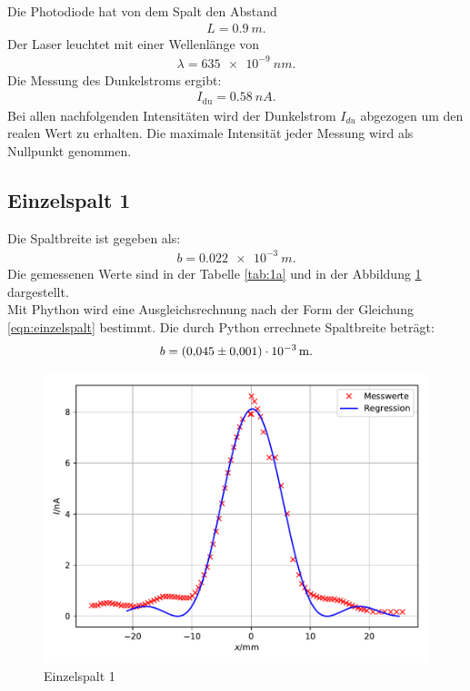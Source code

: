 Die Photodiode hat von dem Spalt den Abstand
\begin{align*}
  L=\SI{0,9}{m}.
\end{align*}
Der Laser leuchtet mit einer Wellenlänge von
\begin{align*}
  \lambda=\SI{635e-9}{nm}.
\end{align*}
Die Messung des Dunkelstroms ergibt:
\begin{align*}
  I_{\text{du}}=\SI{0,58}{nA}.
\end{align*}
Bei allen nachfolgenden Intensitäten wird der Dunkelstrom $I_{du}$ abgezogen um den realen Wert zu erhalten.
Die maximale Intensität jeder Messung wird als Nullpunkt genommen.
\subsection{Einzelspalt 1}
Die Spaltbreite ist gegeben als:
\begin{align*}
  b=\SI{0,022e-3}{m}.
\end{align*}
Die gemessenen Werte sind in der Tabelle \ref{tab:1a} und in der Abbildung \ref{fig:1a} dargestellt.\\
Mit Phython wird eine Ausgleichsrechnung nach der Form der Gleichung \ref{eqn:einzelspalt} bestimmt.
Die durch Python errechnete Spaltbreite beträgt:
\begin{align*}
  b=\SI{0,045\pm0,001e-3}{m}.
\end{align*}

\begin{figure}
  \includegraphics{1a.pdf}
  \caption{Einzelspalt 1}
  \label{fig:1a}
\end{figure}
\FloatBarrier
